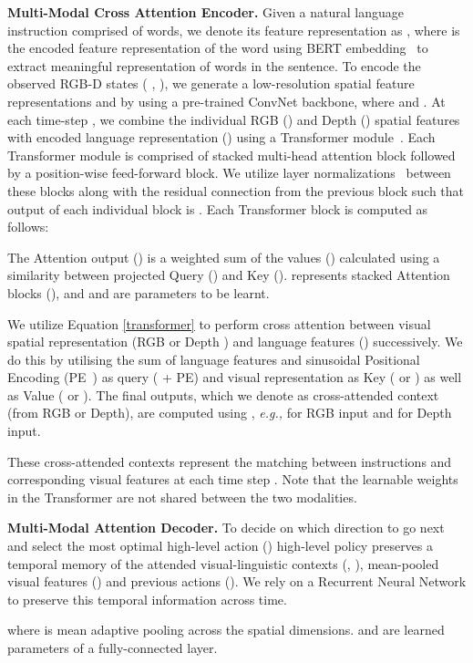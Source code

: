 \documentclass[letter, 10pt, conference]{ieeeconf}
\begin{document}
\textbf{Multi-Modal Cross Attention Encoder.}
Given a natural language instruction comprised of  words, we denote its feature representation as , where  is the encoded feature representation of the  word using BERT embedding~\cite{devlin-etal-2019-bert} to extract meaningful representation of words in the sentence.
To encode the observed RGB-D states (  ,   ), we generate a low-resolution spatial feature representations    and    by using a pre-trained ConvNet backbone, where  and .
At each time-step , we combine the individual RGB () and Depth () spatial features with encoded language representation () using a Transformer module~\cite{NIPS2017_7181}. Each Transformer module is comprised of stacked multi-head attention block  followed by a position-wise feed-forward block. We utilize layer normalizations~\cite{ba2016layer} between these blocks along with the residual connection from the previous block such that output of each individual block is . Each Transformer block is computed as follows:


The Attention output () is a weighted sum of the values () calculated using a similarity between projected Query () and Key ().  represents stacked Attention blocks (), and  and  are parameters to be learnt. 

We utilize Equation \ref{transformer} to perform cross attention between visual spatial representation (RGB  or Depth ) and language features () successively. We do this by utilising the sum of language features and sinusoidal Positional Encoding (PE~\cite{NIPS2017_7181}) as query ( + PE) and visual representation as Key ( or ) as well as Value ( or ).
The final outputs, which we denote as cross-attended context (from RGB or Depth), are computed using , \textit{e.g.,}  for RGB input and  for Depth input.

These cross-attended contexts represent the matching between instructions and corresponding visual features at each time step .
Note that the learnable weights in the Transformer are not shared between the two modalities. 

\textbf{Multi-Modal Attention Decoder.}
To decide on which direction to go next and select the most optimal high-level action () high-level policy preserves a temporal memory of the attended visual-linguistic contexts (, ), mean-pooled visual features () and previous actions (). We rely on a Recurrent Neural Network to preserve this temporal information across time.


where  is mean adaptive pooling across the spatial dimensions.  and  are learned parameters of a fully-connected layer.
\end{document}

